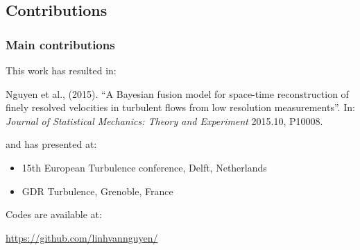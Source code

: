 \documentclass{beamer}
\let\olditem\item
\renewcommand{\item}{\setlength{\itemsep}{\fill}\olditem}
\begin{document}
\subsection[Contributions]{Contributions}
\begin{frame}
\frametitle{Main contributions}
	\begin{minipage}{\textwidth}
		\begin{minipage}[t]{0.425\textwidth}
				This work has resulted in:
				
				{\scriptsize Nguyen et al., (2015). ``A Bayesian fusion model for space-time reconstruction of finely resolved velocities in turbulent flows from low resolution
				measurements''. In: \textit{Journal of Statistical Mechanics: Theory and Experiment} 2015.10, P10008.}
				
				
				and has presented at:
				\begin{itemize}\itemsep0em
					\item \scriptsize 15th European Turbulence conference, Delft, Netherlands
					\item \scriptsize GDR Turbulence, Grenoble, France
				\end{itemize}
				
				Codes are available at:
				
				{\tiny \url{https://github.com/linhvannguyen/}}
				

\end{minipage}
\end{minipage}
\end{frame}
\end{document}
